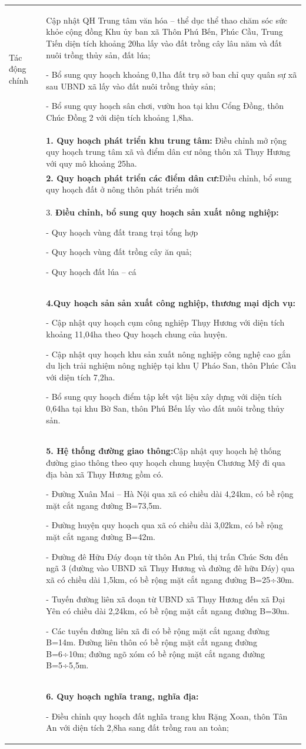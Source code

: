 \documentclass[../thesis.tex]{subfiles}
\begin{document}
\begin{landscape}
\begin{longtable}{ | m{3cm} | m{18cm}| }
Tác động chính    &Cập nhật QH Trung tâm văn hóa – thể dục thể thao chăm sóc sức khỏe cộng đồng Khu ủy ban xã Thôn Phú Bến, Phúc Cầu, Trung Tiến diện tích khoảng 20ha lấy vào đất trồng cây lâu năm và đất nuôi trồng thủy sản, đất lúa; \par -  Bổ sung quy hoạch khoảng 0,1ha đất trụ sở ban chỉ quy quân sự xã sau UBND xã lấy vào đất nuôi trồng thủy sản; \par -  Bổ sung quy hoạch sân chơi, vườn hoa tại khu Cổng Đồng, thôn Chúc Đồng 2 với diện tích khoảng 1,8ha. \\&\textbf{ 1. Quy hoạch phát triển khu trung tâm:} Điều chỉnh mở rộng quy hoạch trung tâm xã và điểm dân cư nông thôn xã Thụy Hương với quy mô khoảng 25ha. \\& \textbf{2. Quy hoạch phát triển các điểm dân cư:}Điều chỉnh, bổ sung quy hoạch đất ở nông thôn phát triển mới\\& 3.\textbf{ Điều chỉnh, bổ sung quy hoạch sản xuất nông nghiệp:}\par - Quy hoạch vùng đất trang trại tổng hợp \par - Quy hoạch vùng đất trồng cây ăn quả;\par - Quy hoạch đất lúa – cá \\& \textbf{4.Quy hoạch sản sản xuất công nghiệp, thương mại dịch vụ:} \par -  Cập nhật quy hoạch cụm công nghiệp Thụy Hương với diện tích khoảng 11,04ha theo Quy hoạch chung của huyện. \par -  Cập nhật quy hoạch khu sản xuất nông nghiệp công nghệ cao gắn du lịch trải nghiệm nông nghiệp tại khu Ụ Pháo San, thôn Phúc Cầu với diện tích 7,2ha. \par -  Bổ sung quy hoạch điểm tập kết vật liệu xây dựng với diện tích 0,64ha tại khu Bờ San, thôn Phú Bến lấy vào đất nuôi trồng thủy sản. \\& \textbf{5. Hệ thống đường giao thông:}Cập nhật quy hoạch hệ thống đường giao thông theo quy hoạch chung huyện Chương Mỹ đi qua địa bàn xã Thụy Hương gồm có. \par -  Đường Xuân Mai – Hà Nội qua xã có chiều dài 4,24km, có bề rộng mặt cắt ngang đường B=73,5m. \par -  Đường huyện quy hoạch qua xã có chiều dài 3,02km, có bề rộng mặt cắt ngang đường B=42m. \par -  Đường đê Hữu Đáy đoạn từ thôn An Phú, thị trấn Chúc Sơn đến ngã 3 (đường vào UBND xã Thụy Hương và đường đê hữu Đáy) qua xã có chiều dài 1,5km, có bề rộng mặt cắt ngang đường B=25÷30m. \par -  Tuyến đường liên xã đoạn từ UBND xã Thụy Hương đến xã Đại Yên có chiều dài 2,24km, có bề rộng mặt cắt ngang đường B=30m. \par -  Các tuyến đường liên xã đi có bề rộng mặt cắt ngang đường B=14m. Đường liên thôn có bề rộng mặt cắt ngang đường B=6÷10m; đường ngõ xóm có bề rộng mặt cắt ngang đường B=5÷5,5m. \\& \textbf{6. Quy hoạch nghĩa trang, nghĩa địa:} \par -  Điều chỉnh quy hoạch đất nghĩa trang khu Rặng Xoan, thôn Tân An với diện tích 2,8ha sang đất trồng rau an toàn; 
\end{longtable}
\end{landscape}
\end{document}
